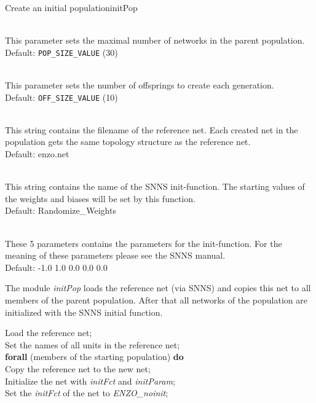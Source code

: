 \begin{moduledoc}{Create an initial population}{initPop}
  \item[\KeyWord{gensize} \optParam{ x } ]~\\
    This parameter sets the maximal number of networks in the parent population.\\
    Default: {\tt POP\_SIZE\_VALUE} (30)
  \item[\KeyWord{popsize} \optParam{ x } ]~\\
    This parameter sets the number of  offsprings to create each generation.\\
    Default: {\tt OFF\_SIZE\_VALUE} (10)
  
  \item[\KeyWord{network} \optParam{ x } ]~\\
    This string contains the filename of the reference net.
    Each created net in the population gets the same topology structure
    as the reference net.\\
    Default:  enzo.net
  
  \item[\KeyWord{initFct} \optParam{ x } ]~\\
    This string contains the name of the SNNS init-function.
    The starting values of the weights and biases will be set by this function.\\
    Default: Randomize\_Weights
  \item[\KeyWord{initParam} \optParam{ x } ]~\\
    These 5 parameters contains the parameters for the init-function.
    For the meaning of these parameters please see the SNNS manual.\\
    Default: -1.0 1.0 0.0 0.0 0.0
\end{moduledoc}

The module {\it initPop} loads the reference net (via SNNS) and copies this
net to all members of the parent population. After that all networks of the population
are initialized with the SNNS initial function.

{
Load the reference net;\\
Set the names of all units in the reference net;\\
{\bf forall} (members of the starting population) {\bf do}\\
\hspace*{0.5cm}Copy the reference net to the new net;\\
\hspace*{0.5cm}Initialize the net with {\it initFct} and {\it initParam};\\
\hspace*{0.5cm}Set the {\it initFct} of the net to {\it ENZO\_noinit};\\
}





